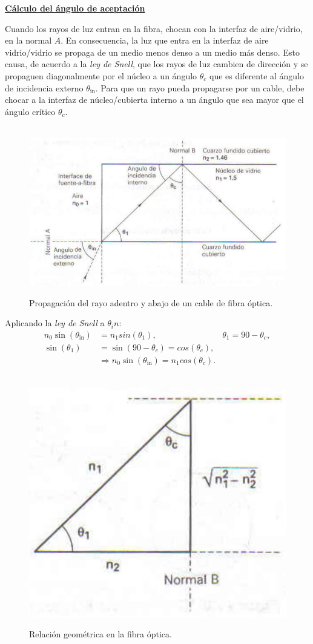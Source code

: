 \documentclass[10pt,a4paper]{article}
\begin{document}
\underline{\textbf{Cálculo del ángulo de aceptación}}

Cuando los rayos de luz entran en la fibra, chocan con la interfaz de aire/vidrio, en la normal $A$. En consecuencia, la luz que entra en la interfaz de aire vidrio/vidrio se propaga de un medio menos denso a un medio más denso. Esto causa, de acuerdo a la \textit{ley de Snell}, que los rayos de luz cambien de dirección y se propaguen diagonalmente por el núcleo a un ángulo $\theta_c$ que es diferente al ángulo de incidencia externo $\theta_\text{in}$. Para que un rayo pueda propagarse por un cable, debe chocar a la interfaz de núcleo/cubierta interno a un ángulo que sea mayor que el ángulo crítico $\theta_c$.

\begin{figure}[ht!]
  \caption{Propagación del rayo adentro y abajo de un cable de fibra óptica.}
  \label{fig:calculo_angulo_aceptacion}  
  \centering
  \hbox{
	\includegraphics[width=\textwidth-\fboxrule-\fboxrule]{imgs/calculo_angulo_aceptacion.jpg}}
\end{figure}
 
Aplicando la \textit{ley de Snell} a $\theta_in$:
\begin{align*}
n_0 \sin (\theta_\text{in}) &= n_1 sin (\theta_1), 
&\theta_1 = 90 - \theta_c, \\
\sin (\theta_1) &= \sin(90 - \theta_c) = cos (\theta_c), \\
&\Rightarrow n_0 \sin (\theta_\text{in}) = n_1 cos (\theta_c).
\end{align*} 

\begin{figure}
  \caption{Relación geométrica en la fibra óptica.}
  \label{fig:pitagoras}  
  \centering
  \hbox{
	\includegraphics[width=.4\textwidth-\fboxrule-\fboxrule]{imgs/pitagoras.jpg}}
\end{figure}
\end{document}
